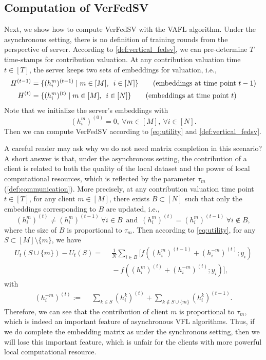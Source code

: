 \subsection{Computation of VerFedSV}
Next, we show how to compute VerFedSV with the VAFL algorithm. Under the asynchronous setting, there is no definition of training rounds from the perspective of server. According to \autoref{def:vertical_fedsv}, we can pre-determine $T$ time-stamps for contribution valuation. At any contribution valuation time $t \in [T]$, the server keeps two sets of embeddings for valuation, i.e.,
\begin{align*}
  H^{(t-1)} &= \{(h_i^m)^{(t-1)}\mid m \in [M], \enspace i \in [N]\}  \tag{\mbox{embeddings at time point }$t-1$}\\
  H^{(t)} &= \{(h_i^m)^{(t)}\mid m \in [M], \enspace i \in [N]\} \tag{\mbox{embeddings at time point }$t$}
\end{align*}
Note that we initialize the server's embeddings with
\[(h_i^m)^{(0)} = 0, ~\forall m \in [M], ~\forall i \in [N].\]
Then we can compute VerFedSV according to \eqref{eq:utility} and \autoref{def:vertical_fedsv}. 

A careful reader may ask why we do not need matrix completion in this scenario? A short answer is that, under the asynchronous setting, the contribution of a client is related to both the quality of the local dataset and the power of local computational resources, which is reflected by the parameter $\tau_m$ (\autoref{def:communication}). More precisely, at any contribution valuation time point $t \in [T]$, for any client $m \in [M]$, there exists $B \subset [N]$ such that only the embeddings corresponding to $B$ are updated, i.e.,
\[(h_i^m)^{(t)} \neq (h_i^m)^{(t-1)} ~\forall i \in B \enspace\text{and}\enspace (h_i^m)^{(t)} = (h_i^m)^{(t-1)} ~\forall i \notin B,\]
where the size of $B$ is proportional to $\tau_m$. Then according to \eqref{eq:utility}, for any $S \subset [M] \setminus \{m\}$, we have 
\begin{align*}
    U_t(S \cup \{m\}) - U_t(S) = ~&~ \frac{1}{N}\sum_{i \in B} \bigg[ f\left( (h_i^m)^{(t-1)} + (h_i^{-m})^{(t)}; y_i\right) \\
    ~&~ - f\left( (h_i^m)^{(t)} + (h_i^{-m})^{(t)}; y_i\right) \bigg],
\end{align*}
with
\begin{align*}
    (h_i^{-m})^{(t)} := ~&~ \sum_{k\in S} (h_i^k)^{(t)} + \sum_{k\notin S \cup \{m\}} (h_i^k)^{(t-1)}.
\end{align*}
Therefore, we can see that the contribution of client $m$ is proportional to $\tau_m$, which is indeed an important feature of asynchronous VFL algorithms. Thus, if we do complete the embedding matrix as under the synchronous setting, then we will lose this important feature, which is unfair for the clients with more powerful local computational resource. 

